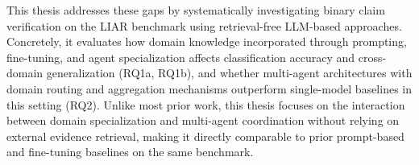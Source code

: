 This thesis addresses these gaps by systematically investigating binary claim verification on the LIAR benchmark using retrieval-free LLM-based approaches. Concretely, it evaluates how domain knowledge incorporated through prompting, fine-tuning, and agent specialization affects classification accuracy and cross-domain generalization (RQ1a, RQ1b), and whether multi-agent architectures with domain routing and aggregation mechanisms outperform single-model baselines in this setting (RQ2). Unlike most prior work, this thesis focuses on the interaction between domain specialization and multi-agent coordination without relying on external evidence retrieval, making it directly comparable to prior prompt-based and fine-tuning baselines on the same benchmark.